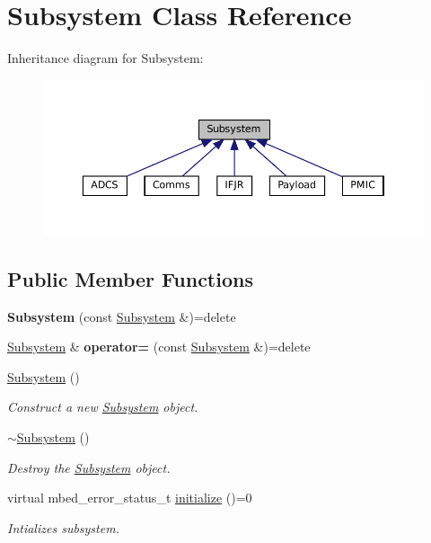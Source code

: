 \hypertarget{class_subsystem}{}\section{Subsystem Class Reference}
\label{class_subsystem}


Inheritance diagram for Subsystem\+:\nopagebreak
\begin{figure}[H]
\begin{center}
\leavevmode
\includegraphics[width=350pt]{class_subsystem__inherit__graph}
\end{center}
\end{figure}
\subsection*{Public Member Functions}
\begin{DoxyCompactItemize}
\item 
\mbox{\label{class_subsystem_a25107684f83f2332e65ee5becb135bbb}} 
{\bfseries Subsystem} (const \mbox{\hyperlink{class_subsystem}{Subsystem}} \&)=delete
\item 
\mbox{\label{class_subsystem_ae7cfc46207afcb926076e0b0074bd07a}} 
\mbox{\hyperlink{class_subsystem}{Subsystem}} \& {\bfseries operator=} (const \mbox{\hyperlink{class_subsystem}{Subsystem}} \&)=delete
\item 
\mbox{\hyperlink{class_subsystem_abdec44abe9ddba76f65abb02f8f62992}{Subsystem}} ()
\begin{DoxyCompactList}\small\item\em Construct a new \mbox{\hyperlink{class_subsystem}{Subsystem}} object. \end{DoxyCompactList}\item 
\mbox{\hyperlink{class_subsystem_af6026d0c678986cf1626251bf38916fa}{$\sim$\+Subsystem}} ()
\begin{DoxyCompactList}\small\item\em Destroy the \mbox{\hyperlink{class_subsystem}{Subsystem}} object. \end{DoxyCompactList}\item 
virtual mbed\+\_\+error\+\_\+status\+\_\+t \mbox{\hyperlink{class_subsystem_afa43e7c1c8b49e514b944f517d4dc905}{initialize}} ()=0
\begin{DoxyCompactList}\small\item\em Intializes subsystem. \end{DoxyCompactList}\end{DoxyCompactItemize}


